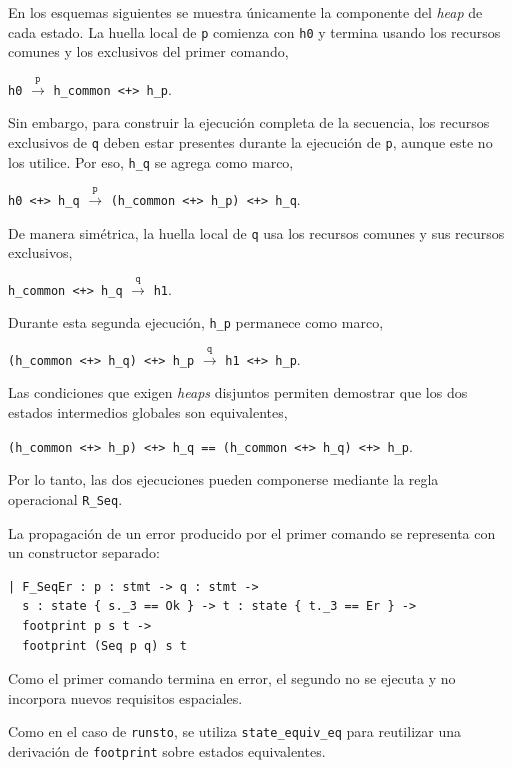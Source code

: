 \documentclass[a4paper,	11pt]{report}
\newif\ifdraft\drafttrue
\newcommand{\comm}[3]{\ifdraft{{\color{#1}[#2: #3]}}\fi}
\newcommand{\guido}[1]{\comm{blue}{Guido}{#1}}
\begin{document}
En los esquemas siguientes se muestra únicamente la componente del \emph{heap} de cada estado.
La huella local de \lstinline|p| comienza con \lstinline|h0| y termina usando los recursos comunes y los exclusivos del primer comando,
\begin{center}
\lstinline|h0| $\xrightarrow{\texttt{p}}$ \lstinline|h_common <+> h_p|.
\end{center}
Sin embargo,
para construir la ejecución completa de la secuencia,
los recursos exclusivos de \lstinline|q| deben estar presentes durante la ejecución de \lstinline|p|,
aunque este no los utilice.
Por eso,
\lstinline|h_q| se agrega como marco,
\begin{center}
\lstinline|h0 <+> h_q| $\xrightarrow{\texttt{p}}$ \lstinline|(h_common <+> h_p) <+> h_q|.
\end{center}
De manera simétrica,
la huella local de \lstinline|q| usa los recursos comunes y sus recursos exclusivos,
\begin{center}
\lstinline|h_common <+> h_q| $\xrightarrow{\texttt{q}}$ \lstinline|h1|.
\end{center}
Durante esta segunda ejecución,
\lstinline|h_p| permanece como marco,
\begin{center}
\lstinline|(h_common <+> h_q) <+> h_p| $\xrightarrow{\texttt{q}}$ \lstinline|h1 <+> h_p|.
\end{center}
Las condiciones que exigen \emph{heaps} disjuntos permiten demostrar que los dos estados intermedios globales son equivalentes,
\begin{center}
\lstinline|(h_common <+> h_p) <+> h_q == (h_common <+> h_q) <+> h_p|.
\end{center}
Por lo tanto,
las dos ejecuciones pueden componerse mediante la regla operacional \lstinline|R_Seq|.

La propagación de un error producido por el primer comando se representa con un constructor separado:

\begin{lstlisting}
| F_SeqEr : p : stmt -> q : stmt ->
  s : state { s._3 == Ok } -> t : state { t._3 == Er } ->
  footprint p s t ->
  footprint (Seq p q) s t
\end{lstlisting}
Como el primer comando termina en error,
el segundo no se ejecuta y no incorpora nuevos requisitos espaciales.

Como en el caso de \lstinline|runsto|,
se utiliza \lstinline|state_equiv_eq| para reutilizar una derivación de \lstinline|footprint| sobre estados equivalentes.
\end{document}
